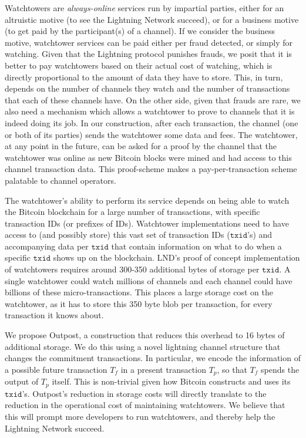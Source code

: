 Watchtowers are \textit{always-online} services run by impartial parties, either for an altruistic motive (to see the Lightning Network succeed), or for a business motive (to get paid by the participant(s) of a channel). If we consider the business motive, watchtower services can be paid either per fraud detected, or simply for watching. Given that the Lightning protocol punishes frauds, we posit that it is better to pay watchtowers based on their actual cost of watching, which is directly proportional to the amount of data they have to store. This, in turn, depends on the number of channels they watch and the number of transactions that each of these channels have. On the other side, given that frauds are rare, we also need a mechanism which allows a watchtower to prove to channels that it is indeed doing its job. In our construction, after each transaction, the channel (one or both of its parties) sends the watchtower some data and fees. The watchtower, at any point in the future, can be asked for a proof by the channel that the watchtower was online as new Bitcoin blocks were mined and had access to this channel transaction data. This proof-scheme makes a pay-per-transaction scheme palatable to channel operators.

The watchtower's ability to perform its service depends on being able to watch the Bitcoin blockchain for a large number of transactions, with specific transaction IDs (or prefixes of IDs). Watchtower implementations need to have access to (and possibly store) this vast set of transaction IDs ($\texttt{txid}$'s) and accompanying data per $\texttt{txid}$ that contain information on what to do when a specific $\texttt{txid}$ shows up on the blockchain. LND's proof of concept implementation of watchtowers \cite{lnd_watchtower} requires around 300-350 additional bytes of storage per $\texttt{txid}$. A single watchtower could watch millions of channels and each channel could have billions of these micro-transactions. This places a large storage cost on the watchtower, as it has to store this 350 byte blob per transaction, for every transaction it knows about. 

We propose Outpost, a construction that reduces this overhead to 16 bytes of additional storage. We do this using a novel lightning channel structure that changes the commitment transactions. In particular, we encode the information of a possible future transaction $T_f$ in a present transaction $T_p$, so that $T_f$ spends the output of $T_p$ itself. This is non-trivial given how Bitcoin constructs and uses its $\texttt{txid}$'s. Outpost's reduction in storage costs will directly translate to the reduction in the operational cost of maintaining watchtowers. We believe that this will prompt more developers to run watchtowers, and thereby help the Lightning Network succeed.

